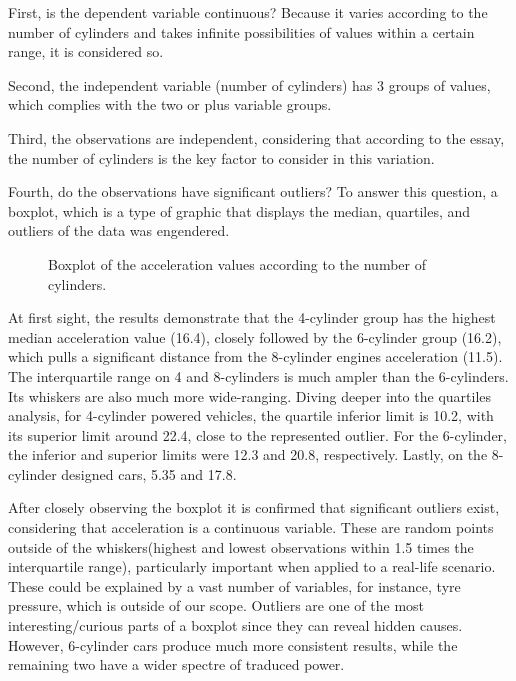 \documentclass[conference]{IEEEtran}
\begin{document}
First, is the dependent variable continuous? Because it varies according to the number of cylinders and takes infinite possibilities of values within a certain range, it is considered so.

Second, the independent variable (number of cylinders) has 3 groups of values, which complies with the two or plus variable groups.

Third, the observations are independent, considering that according to the essay, the number of cylinders is the key factor to consider in this variation.

Fourth, do the observations have significant outliers? To answer this question, a boxplot, which is a type of graphic that displays the median, quartiles, and outliers of the data was engendered.

\begin{figure}[htbp]
    \caption{Boxplot of the acceleration values according to the number of cylinders.}
    \label{vehicle_boxplot}
\end{figure}

At first sight, the results demonstrate that the 4-cylinder group has the highest median acceleration value (16.4), closely followed by the 6-cylinder group (16.2), 
which pulls a significant distance from the 8-cylinder engines acceleration (11.5). 
The interquartile range on 4 and 8-cylinders is much ampler than the 6-cylinders.
Its whiskers are also much more wide-ranging. 
Diving deeper into the quartiles analysis, for 4-cylinder powered vehicles, the quartile inferior limit is 10.2, with its superior limit around 22.4, close to the represented outlier. 
For the 6-cylinder, the inferior and superior limits were 12.3 and 20.8, respectively.
Lastly, on the 8-cylinder designed cars, 5.35 and 17.8.

After closely observing the boxplot it is confirmed that significant outliers exist, considering that acceleration is a continuous variable.
These are random points outside of the whiskers(highest and lowest observations within 1.5 times the interquartile range), particularly important when applied to a real-life scenario.
These could be explained by a vast number of variables, for instance, tyre pressure, which is outside of our scope.
Outliers are one of the most interesting/curious parts of a boxplot since they can reveal hidden causes.\\

However, 6-cylinder cars produce much more consistent results, while the remaining two have a wider spectre of traduced power.
\end{document}
